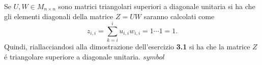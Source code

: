 Se $U,W \in M_{n \times n}$ sono matrici triangolari superiori a diagonale unitaria si ha che gli elementi diagonali della matrice $Z=UW$ saranno calcolati come
\[
z_{i,i} = \sum_{k=i}^{i} u_{i,i}w_{i,i} = 1 \cdots 1 = 1.
\]
Quindi, riallacciandosi alla dimostrazione dell'esercizio \textbf{3.1} si ha che la matrice $Z$ \'e triangolare superiore a diagonale unitaria.
$symbol$
